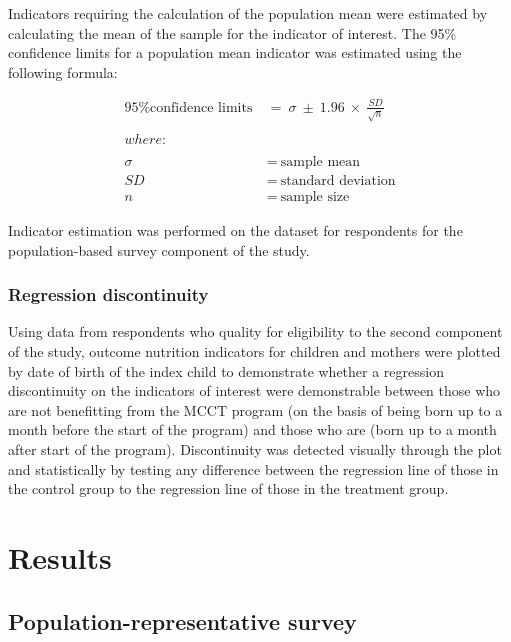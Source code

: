 \documentclass[12pt,a4paper]{article}
\begin{document}
Indicators requiring the calculation of the population mean were estimated by calculating the mean of the sample for the indicator of interest. The 95\% confidence limits for a population mean indicator was estimated using the following formula:

\[
\begin{aligned}
\text{95\% confidence limits} & ~ = ~ \sigma ~ \pm ~ 1.96 ~ \times ~ \frac{SD}{\sqrt{n}} \\
\\
where: & \\
\\
\sigma & ~ = ~ \text{sample mean} \\
SD & ~ = ~ \text{standard deviation} \\
n & ~ = ~ \text{sample size}
\end{aligned}
\]

Indicator estimation was performed on the dataset for respondents for the population-based survey component of the study.

\hypertarget{regression-discontinuity}{%
\subsubsection{Regression discontinuity}\label{regression-discontinuity}}

Using data from respondents who quality for eligibility to the second component of the study, outcome nutrition indicators for children and mothers were plotted by date of birth of the index child to demonstrate whether a regression discontinuity on the indicators of interest were demonstrable between those who are not benefitting from the MCCT program (on the basis of being born up to a month before the start of the program) and those who are (born up to a month after start of the program). Discontinuity was detected visually through the plot and statistically by testing any difference between the regression line of those in the control group to the regression line of those in the treatment group.

\hypertarget{results}{%
\section{Results}\label{results}}

\hypertarget{study1-results}{%
\subsection{Population-representative survey}\label{study1-results}}
\end{document}
